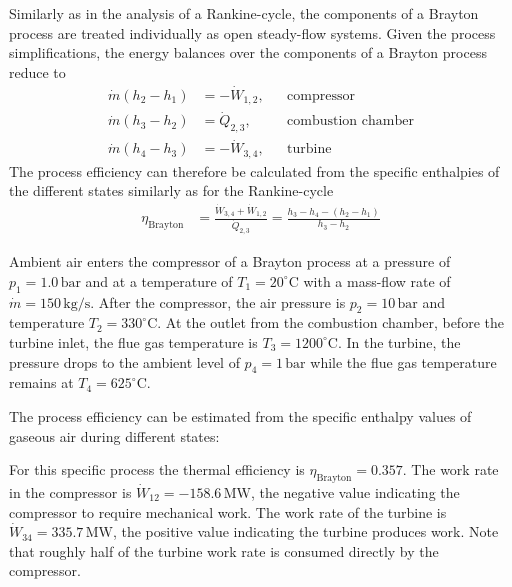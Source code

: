 Similarly as in the analysis of a Rankine-cycle, the components of a Brayton process are treated individually as open steady-flow systems. Given the process simplifications, the energy balances over the components of a Brayton process reduce to
\begin{align}
    \dot{m}(h_2-h_1)&=-\dot{W}_{1,2}, & &\text{compressor}\\
    \dot{m}(h_3-h_2)&=\dot{Q}_{2,3}, & &\text{combustion chamber}\\
    \dot{m}(h_4-h_3)&=-\dot{W}_{3,4}, & &\text{turbine}
\end{align}
The process efficiency can therefore be calculated from the specific enthalpies of the different states similarly as for the Rankine-cycle
\begin{align}
    \eta_{\text{Brayton}}&=\frac{\dot{W}_{3,4}+\dot{W}_{1,2}}{\dot{Q}_{2,3}}=\frac{h_3-h_4-(h_2-h_1)}{h_3-h_2}
\end{align}
\begin{example}
    Ambient air enters the compressor of a Brayton process at a pressure of $p_1=1.0\,\text{bar}$ and at a temperature of $T_1=20^\circ\text{C}$ with a mass-flow rate of $\dot{m}=150\,\text{kg}/\text{s}$. After the compressor, the air pressure is $p_2=10\,\text{bar}$ and temperature $T_2=330^\circ\text{C}$. At the outlet from the combustion chamber, before the turbine inlet, the flue gas temperature is $T_3=1200^\circ\text{C}$. In the turbine, the pressure drops to the ambient level of $p_4=1\,\text{bar}$ while the flue gas temperature remains at $T_4=625^\circ\text{C}$. 

    The process efficiency can be estimated from the specific enthalpy values of gaseous air during different states: 
     
    For this specific process the thermal efficiency is $\eta_\text{Brayton}=0.357$. The work rate in the compressor is $\dot{W}_{12}=-158.6\,\text{MW}$, the negative value indicating the compressor to require mechanical work. The work rate of the turbine is $\dot{W}_{34}=335.7\,\text{MW}$, the positive value indicating the turbine produces work. Note that roughly half of the turbine work rate is consumed directly by the compressor. 
\end{example}

